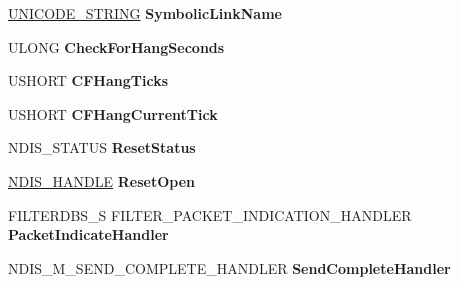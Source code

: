 \begin{DoxyCompactItemize}
\item 
\mbox{\label{struct___n_d_i_s___m_i_n_i_p_o_r_t___b_l_o_c_k_a9da0dd5b5836e1fe8396fbd739039e72}} 
\hyperlink{struct___u_n_i_c_o_d_e___s_t_r_i_n_g}{U\+N\+I\+C\+O\+D\+E\+\_\+\+S\+T\+R\+I\+NG} {\bfseries Symbolic\+Link\+Name}
\item 
\mbox{\label{struct___n_d_i_s___m_i_n_i_p_o_r_t___b_l_o_c_k_ab98259915c60235b0f05d1a727d5b4e1}} 
U\+L\+O\+NG {\bfseries Check\+For\+Hang\+Seconds}
\item 
\mbox{\label{struct___n_d_i_s___m_i_n_i_p_o_r_t___b_l_o_c_k_acc2d2150fb118db1080195c2ab3dc693}} 
U\+S\+H\+O\+RT {\bfseries C\+F\+Hang\+Ticks}
\item 
\mbox{\label{struct___n_d_i_s___m_i_n_i_p_o_r_t___b_l_o_c_k_a87f9908338c2bed02f1aa0963d3d7fff}} 
U\+S\+H\+O\+RT {\bfseries C\+F\+Hang\+Current\+Tick}
\item 
\mbox{\label{struct___n_d_i_s___m_i_n_i_p_o_r_t___b_l_o_c_k_acdf49a1a5a1b77e7ba6fa556d95c52cc}} 
N\+D\+I\+S\+\_\+\+S\+T\+A\+T\+US {\bfseries Reset\+Status}
\item 
\mbox{\label{struct___n_d_i_s___m_i_n_i_p_o_r_t___b_l_o_c_k_aa2ee5334f1b9263a844f8585d5bef431}} 
\hyperlink{interfacevoid}{N\+D\+I\+S\+\_\+\+H\+A\+N\+D\+LE} {\bfseries Reset\+Open}
\item 
\mbox{\label{struct___n_d_i_s___m_i_n_i_p_o_r_t___b_l_o_c_k_af292916264bf7e2746f06a4db1d97713}} 
F\+I\+L\+T\+E\+R\+D\+B\+S\+\_\+S F\+I\+L\+T\+E\+R\+\_\+\+P\+A\+C\+K\+E\+T\+\_\+\+I\+N\+D\+I\+C\+A\+T\+I\+O\+N\+\_\+\+H\+A\+N\+D\+L\+ER {\bfseries Packet\+Indicate\+Handler}
\item 
\mbox{\label{struct___n_d_i_s___m_i_n_i_p_o_r_t___b_l_o_c_k_a128a5b96079dcc21a2966b97b34ea23a}} 
N\+D\+I\+S\+\_\+\+M\+\_\+\+S\+E\+N\+D\+\_\+\+C\+O\+M\+P\+L\+E\+T\+E\+\_\+\+H\+A\+N\+D\+L\+ER {\bfseries Send\+Complete\+Handler}

\end{DoxyCompactItemize}
